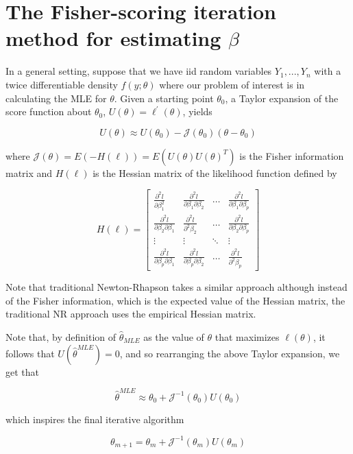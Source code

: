 \section{The Fisher-scoring iteration method for estimating $\beta$}

In a general setting, suppose that we have iid random variables $Y_1, ..., Y_n$ with a twice differentiable density $f(y; \theta)$ where our problem of interest is in calculating the MLE for $\theta$. Given a starting point $\theta_0$, a Taylor expansion of the score function about $\theta_0$, $U(\theta) = \ell^\prime(\theta)$, yields

$$U(\theta) \approx U(\theta_0) - \mathcal{J}(\theta_0)(\theta - \theta_0)$$

where $\mathcal{J}(\theta) = E(-H(\ell)) = E(U(\theta)U(\theta)^T)$ is the Fisher information matrix and $H(\ell)$ is the Hessian matrix of the likelihood function defined by

$$H(\ell) = \left[ \begin{array}{cccc} \frac{\partial^2l}{\partial \beta_1^2} & \frac{\partial^2l}{\partial \beta_1\partial \beta_2} & \dots & \frac{\partial^2l}{\partial \beta_1\partial \beta_p} \\
\frac{\partial^2l}{\partial \beta_2\partial \beta_1} & \frac{\partial^2l}{\partial^2 \beta_2} & \dots & \frac{\partial^2l}{\partial \beta_2\partial \beta_p}\\
\vdots & \vdots & \ddots & \vdots\\
\frac{\partial^2l}{\partial \beta_p\partial \beta_1} & \frac{\partial^2l}{\partial \beta_p\partial \beta_2} & \dots & \frac{\partial^2l}{\partial^2 \beta_p}\end{array}\right]$$

Note that traditional Newton-Rhapson takes a similar approach although instead of the Fisher information, which is the expected value of the Hessian matrix, the traditional NR approach uses the empirical Hessian matrix. 

Note that, by definition of $\hat{\theta}_{MLE}$ as the value of $\theta$ that maximizes $\ell(\theta)$, it follows that $U\left(\hat{\theta}^{MLE}\right) = 0$, and so rearranging the above Taylor expansion, we get that

$$\hat{\theta}^{MLE} \approx \theta_0 + \mathcal{J}^{-1}(\theta_0)U(\theta_0)$$

which inspires the final iterative algorithm

$$\theta_{m + 1} = \theta_m + \mathcal{J}^{-1}(\theta_m)U(\theta_m)$$

